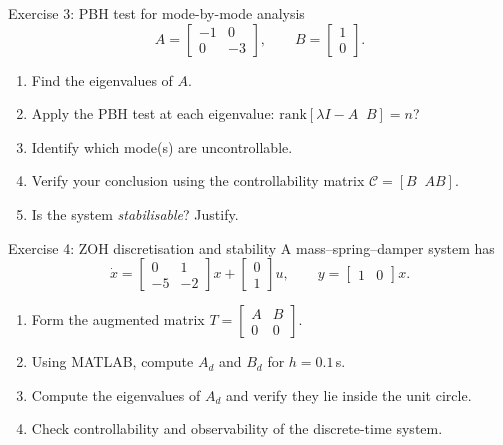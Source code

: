 \documentclass[aspectratio=169,10pt]{beamer}
\newcommand{\Ccal}{\mathcal{C}}
\begin{document}
\begin{frame}{Exercise 3: PBH test for mode-by-mode analysis}
\[
A=\begin{bmatrix}-1&0\\0&-3\end{bmatrix},
\qquad
B=\begin{bmatrix}1\\0\end{bmatrix}.
\]

\begin{enumerate}
  \item Find the eigenvalues of $A$.
  \item Apply the PBH test at each eigenvalue:
        $\mathrm{rank}[\lambda I - A \;\; B]=n$?
  \item Identify which mode(s) are uncontrollable.
  \item Verify your conclusion using the controllability matrix
        $\Ccal=[B\;\;AB]$.
  \item Is the system \emph{stabilisable}?  Justify.
\end{enumerate}
\end{frame}

\begin{frame}{Exercise 4: ZOH discretisation and stability}
A mass--spring--damper system has
\[
\dot{x}=\begin{bmatrix}0&1\\-5&-2\end{bmatrix}x
+\begin{bmatrix}0\\1\end{bmatrix}u,
\qquad
y=\begin{bmatrix}1&0\end{bmatrix}x.
\]

\begin{enumerate}
  \item Form the augmented matrix $T=\begin{bmatrix}A&B\\0&0\end{bmatrix}$.
  \item Using MATLAB, compute $A_d$ and $B_d$ for $h=0.1\,$s.
  \item Compute the eigenvalues of $A_d$ and verify they lie inside the
        unit circle.
  \item Check controllability and observability of the discrete-time system.
\end{enumerate}
\end{frame}
\end{document}

